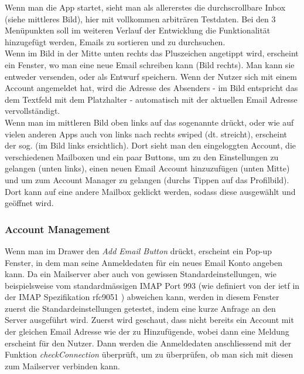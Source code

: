 \documentclass[a4paper,11pt]{article}
\begin{document}
Wenn man die App startet, sieht man als allererstes die durchscrollbare Inbox (siehe mittleres Bild), hier mit vollkommen arbiträren Testdaten. Bei den 3 Menüpunkten soll im weiteren Verlauf der Entwicklung die Funktionalität hinzugefügt werden, Emails zu sortieren und zu durchsuchen.\\

Wenn im Bild in der Mitte unten rechts das Pluszeichen angetippt wird, erscheint ein Fenster, wo man eine neue Email schreiben kann (Bild rechts). Man kann sie entweder versenden, oder als Entwurf speichern. Wenn der Nutzer sich mit einem Account angemeldet hat, wird die Adresse des Absenders - im Bild entspricht das dem Textfeld mit dem Platzhalter  - automatisch mit der aktuellen Email Adresse vervollständigt.\\

Wenn man im mittleren Bild oben links auf das sogenannte  drückt, oder wie auf vielen anderen Apps auch von links nach rechts swiped (dt. streicht), erscheint der sog.  (im Bild links ersichtlich). Dort sieht man den eingeloggten Account, die verschiedenen Mailboxen und ein paar Buttons, um zu den Einstellungen zu gelangen (unten links), einen neuen Email Account hinzuzufügen (unten Mitte) und um zum Account Manager zu gelangen (durchs Tippen auf das Profilbild). Dort kann auf eine andere Mailbox geklickt werden, sodass diese ausgewählt und geöffnet wird.


\newpage

\subsubsection{Account Management}

Wenn man im Drawer den \textit{Add Email Button} drückt, erscheint ein Pop-up Fenster, in dem man seine Anmeldedaten für ein neues Email Konto angeben kann. Da ein Mailserver aber auch von gewissen Standardeinstellungen, wie beispielsweise vom standardmässigen IMAP Port 993 (wie definiert von der \gls{ietf} in der IMAP Spezifikation rfc9051 \cite{rfc9051}) abweichen kann, werden in diesem Fenster zuerst die Standardeinstellungen getestet, indem eine kurze Anfrage an den Server ausgeführt wird. Zuerst wird geschaut, dass nicht bereits ein Account mit der gleichen Email Adresse wie der zu Hinzufügende, wobei dann eine Meldung erscheint für den Nutzer. Dann werden die Anmeldedaten anschliessend mit der Funktion \textit{checkConnection} überprüft, um zu überprüfen, ob man sich mit diesen zum Mailserver verbinden kann.\\
\end{document}
